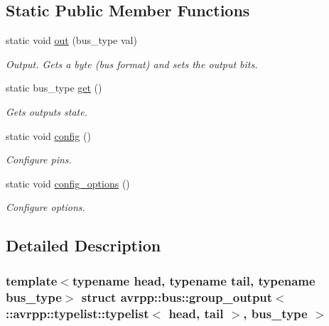 \subsection*{Static Public Member Functions}
\begin{DoxyCompactItemize}
\item 
static void \hyperlink{structavrpp_1_1bus_1_1group__output_3_01_1_1avrpp_1_1typelist_1_1typelist_3_01head_00_01tail_01_4_00_01bus__type_01_4_ad82135090220f6c4695a7952e053614d}{out} (bus\_\-type val)
\begin{DoxyCompactList}\small\item\em Output. Gets a byte (bus format) and sets the output bits. \item\end{DoxyCompactList}\item 
static bus\_\-type \hyperlink{structavrpp_1_1bus_1_1group__output_3_01_1_1avrpp_1_1typelist_1_1typelist_3_01head_00_01tail_01_4_00_01bus__type_01_4_a49ac3f9c69b617ea5cb0113367e6a4cb}{get} ()
\begin{DoxyCompactList}\small\item\em Gets outputs state. \item\end{DoxyCompactList}\item 
static void \hyperlink{structavrpp_1_1bus_1_1group__output_3_01_1_1avrpp_1_1typelist_1_1typelist_3_01head_00_01tail_01_4_00_01bus__type_01_4_a9175e13a217dad807666031bf9a5db70}{config} ()
\begin{DoxyCompactList}\small\item\em Configure pins. \item\end{DoxyCompactList}\item 
static void \hyperlink{structavrpp_1_1bus_1_1group__output_3_01_1_1avrpp_1_1typelist_1_1typelist_3_01head_00_01tail_01_4_00_01bus__type_01_4_ab429a1cb167bb6b120675b0fb08dd109}{config\_\-options} ()
\begin{DoxyCompactList}\small\item\em Configure options. \item\end{DoxyCompactList}\end{DoxyCompactItemize}


\subsection{Detailed Description}
\subsubsection*{template$<$typename head, typename tail, typename bus\_\-type$>$ struct avrpp::bus::group\_\-output$<$ ::avrpp::typelist::typelist$<$ head, tail $>$, bus\_\-type $>$}

